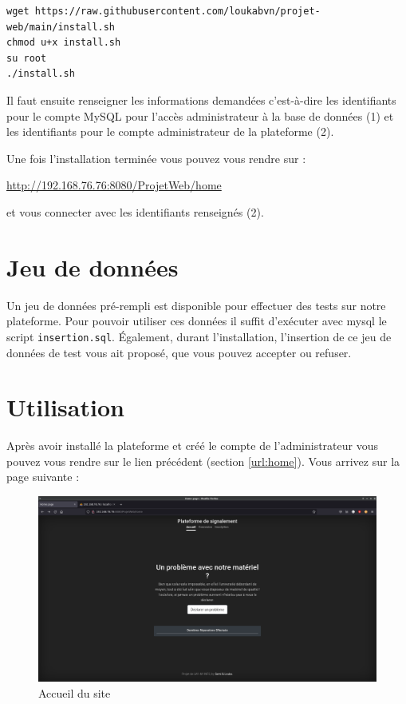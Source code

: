 \begin{verbatim}
wget https://raw.githubusercontent.com/loukabvn/projet-web/main/install.sh
chmod u+x install.sh
su root
./install.sh
\end{verbatim}

Il faut ensuite renseigner les informations demandées c'est-à-dire les identifiants pour le
compte MySQL pour l'accès administrateur à la base de données (1) et les identifiants pour le compte
administrateur de la plateforme (2).

Une fois l'installation terminée vous pouvez vous rendre sur :
\begin{center}
    \label{url:home}
    \url{http://192.168.76.76:8080/ProjetWeb/home}
\end{center}
et vous connecter avec les identifiants renseignés (2).

\section{Jeu de données}

Un jeu de données pré-rempli est disponible pour effectuer des tests sur notre plateforme.
Pour pouvoir utiliser ces données il suffit d'exécuter avec mysql le script \verb:insertion.sql:.
Également, durant l'installation, l'insertion de ce jeu de données de test vous ait proposé, que
vous pouvez accepter ou refuser.
\newpage

\section{Utilisation}

Après avoir installé la plateforme et créé le compte de l'administrateur vous pouvez vous rendre
sur le lien précédent (section \ref{url:home}). Vous arrivez sur la page suivante :

\begin{figure}[!h]
    \centering
    \includegraphics[width=15cm]{img/home.png}
    \caption{Accueil du site}
\end{figure}

